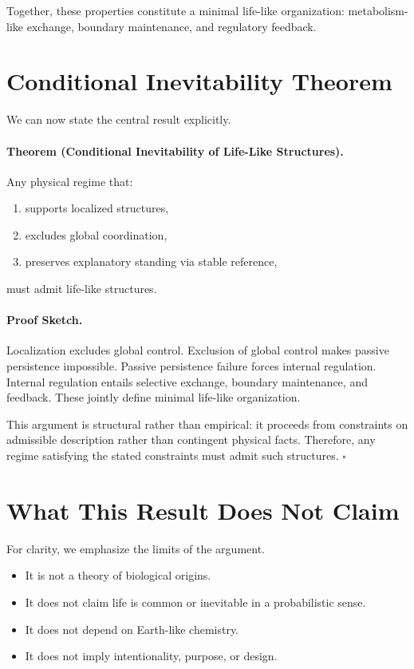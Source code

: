 \documentclass[11pt]{article}
\begin{document}
Together, these properties constitute a minimal life-like organization: metabolism-like exchange, boundary maintenance, and regulatory feedback.

\section{Conditional Inevitability Theorem}

We can now state the central result explicitly.

\paragraph{Theorem (Conditional Inevitability of Life-Like Structures).}
Any physical regime that:
\begin{enumerate}[leftmargin=2em]
\item supports localized structures,
\item excludes global coordination,
\item preserves explanatory standing via stable reference,
\end{enumerate}
must admit life-like structures.

\paragraph{Proof Sketch.}
Localization excludes global control. Exclusion of global control makes passive persistence impossible. Passive persistence failure forces internal regulation. Internal regulation entails selective exchange, boundary maintenance, and feedback. These jointly define minimal life-like organization.

This argument is structural rather than empirical: it proceeds from constraints on admissible description rather than contingent physical facts. Therefore, any regime satisfying the stated constraints must admit such structures. \hfill $\square$

\section{What This Result Does Not Claim}

For clarity, we emphasize the limits of the argument.

\begin{itemize}[leftmargin=2em]
\item It is not a theory of biological origins.
\item It does not claim life is common or inevitable in a probabilistic sense.
\item It does not depend on Earth-like chemistry.
\item It does not imply intentionality, purpose, or design.
\end{itemize}
\end{document}
